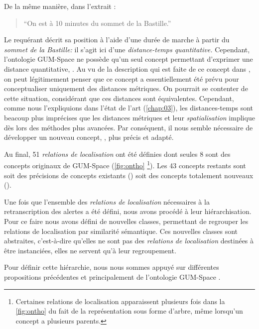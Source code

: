 De la même manière, dans l'extrait :
%
\begin{quote}
  \begin{dialogue}
    \Req \enquote{On est à 10 minutes du sommet de la Bastille.}
  \end{dialogue}
\end{quote}
%
Le requérant décrit sa position à l'aide d'une durée de marche à
partir du \emph{sommet de la Bastille:} il s'agit ici d'une
\emph{distance-temps quantitative.} Cependant, l'ontologie GUM-Space
ne possède qu'un seul concept permettant d'exprimer une distance
quantitative, . Au vu de la
description qui est faite de ce concept dans \textcite{Bateman2010},
on peut légitimement penser que ce concept a essentiellement été prévu
pour conceptualiser uniquement des distances métriques. On pourrait se
contenter de cette situation, considérant que ces distances sont
équivalentes. Cependant, comme nous l'expliquions dans l'état de l'art
(\autoref{chap:03}), les distances-temps sont beacoup plus imprécises
que les distances métriques et leur \emph{spatialisation} implique dès
lors des méthodes plus avancées. Par conséquent, il nous semble
nécessaire de développer un nouveau concept,
, plus précis et adapté.

Au final, 51 \emph{relations de localisation} ont été définies dont
seules 8 sont des concepts originaux de GUM-Space (\autoref{fig:ontho}
\footnote{Certaines relations de localisation apparaissent plusieurs
  fois dans la \autoref{fig:ontho} du fait de la représentation sous
  forme d'arbre, même lorsqu'un concept a plusieurs parents. }). Les
43 concepts restants sont soit des précisions de concepts existants
(\eg {}) soit des concepts totalement
nouveaux (\eg {}).

Une fois que l'ensemble des \emph{relations de localisation}
nécessaires à la retranscription des alertes a été défini, nous avons
procédé à leur hiérarchisation. Pour ce faire nous avons défini de
nouvelles classes, permettant de regrouper les relations de
localisation par similarité sémantique. Ces nouvelles classes sont
abstraites, c'est-à-dire qu'elles ne sont pas des \emph{relations de
  localisation} destinées à être instanciées, elles ne servent qu'à
leur regroupement.

Pour définir cette hiérarchie, nous nous sommes appuyé sur différentes
propositions précédentes et principalement de l'ontologie GUM-Space
\autocite{Bateman2010}.

